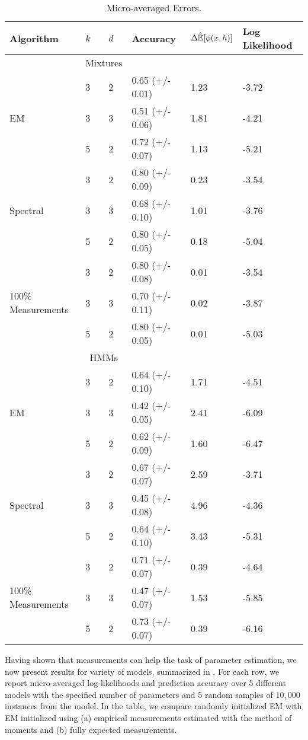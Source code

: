 \begin{table}
    \label{tab:errors}
    \begin{tabular}{l | l l | l l l }
        Algorithm & $k$ & $d$ & Accuracy & $\Delta \hat {\mathbb{E}}[\phi(x,h)]$ & Log Likelihood \\ \hline
        & \multicolumn{2}{|c|}{Mixtures} & & & \\ \hline
        \multirow{3}{*}{EM} 
        & 3 & 2 & 0.65 (+/- 0.01) & 1.23 & -3.72 \\
        & 3 & 3 & 0.51 (+/- 0.06) & 1.81 & -4.21\\
        & 5 & 2 & 0.72 (+/- 0.07) & 1.13 & -5.21\\ \hline
        \multirow{3}{*}{Spectral} 
        & 3 & 2 & 0.80 (+/- 0.09) & 0.23 & -3.54 \\
        & 3 & 3 & 0.68 (+/- 0.10) & 1.01 & -3.76 \\
        & 5 & 2 & 0.80 (+/- 0.05) & 0.18 & -5.04 \\ \hline
        \multirow{3}{*}{100\% Measurements} 
        & 3 & 2 & 0.80 (+/- 0.08) & 0.01& -3.54 \\
        & 3 & 3 & 0.70 (+/- 0.11) & 0.02& -3.87 \\
        & 5 & 2 & 0.80 (+/- 0.05) & 0.01& -5.03 \\ \hline
        & \multicolumn{2}{|c|}{HMMs} & & & \\ \hline
        \multirow{3}{*}{EM} 
& 3 & 2 & 0.64 (+/- 0.10) & 1.71 & -4.51 \\  
& 3 & 3 & 0.42 (+/- 0.05) & 2.41 & -6.09 \\  
& 5 & 2 & 0.62 (+/- 0.09) & 1.60 & -6.47 \\  \hline
        \multirow{3}{*}{Spectral} 
& 3 & 2 & 0.67 (+/- 0.07) & 2.59 & -3.71 \\ 
& 3 & 3 & 0.45 (+/- 0.08) & 4.96 & -4.36 \\ 
& 5 & 2 & 0.64 (+/- 0.10) & 3.43 & -5.31 \\ \hline
        \multirow{3}{*}{100\% Measurements} 
& 3 & 2 & 0.71 (+/- 0.07) & 0.39 & -4.64 \\ 
& 3 & 3 & 0.47 (+/- 0.07) & 1.53 & -5.85 \\ 
& 5 & 2 & 0.73 (+/- 0.07) & 0.39 & -6.16 \\ \hline
    \end{tabular}
    \caption{Micro-averaged Errors.}
\end{table}

Having shown that measurements can help the task of parameter estimation, we
now present results for variety of models, summarized in . 
For each row, we report micro-averaged log-likelihoods and prediction accuracy
over 5 different models with the specified number of parameters and 5 random
samples of $10,000$ instances from the model. 
In the table, we compare randomly initialized EM with EM initialized using (a)
empirical measurements estimated with the method of moments and (b) fully
expected measurements.

